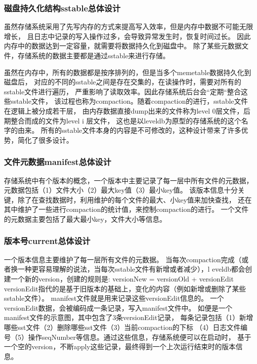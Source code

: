 		\subsubsection{磁盘持久化结构sstable总体设计}

		虽然存储系统采用了先写内存的方式来提高写入效率，但是内存中数据不可能无限增长，
		且日志中记录的写入操作过多，会导致异常发生时，恢复时间过长。
		因此内存中的数据达到一定容量，就需要将数据持久化到磁盘中。
		除了某些元数据文件，存储系统的数据主要都是通过sstable来进行存储。

		虽然在内存中，所有的数据都是按序排列的，但是当多个memetable数据持久化到磁盘后，
		对应的不同的sstable之间是存在交集的，在读操作时，需要对所有的sstable文件进行遍历，
		严重影响了读取效率。因此存储系统后台会“定期“整合这些sstable文件，
		该过程也称为compaction。随着compaction的进行，sstable文件在逻辑上被分成若干层，
		由内存数据直接dump出来的文件称为level 0层文件，后期整合而成的文件为level i 层文件，
		这也是以leveldb为原型的存储系统的这个名字的由来。
		所有的sstable文件本身的内容是不可修改的，这种设计带来了许多优势，简化了很多设计。

		\subsubsection{文件元数据manifest总体设计}

		存储系统中有个版本的概念，一个版本中主要记录了每一层中所有文件的元数据，
		元数据包括（1）文件大小（2）最大key值（3）最小key值。
		该版本信息十分关键，除了在查找数据时，利用维护的每个文件的最大、小key值来加快查找，
		还在其中维护了一些进行compaction的统计值，来控制compaction的进行。
		一个文件的元数据主要包括了最大最小key，文件大小等信息。
		

		\subsubsection{版本号current总体设计}

		一个版本信息主要维护了每一层所有文件的元数据。
		当每次compaction完成（或者换一种更容易理解的说法，当每次sstable文件有新增或者减少），l
		eveldb都会创建一个新的version，创建的规则是: versionNew = versionOld + versionEdit
		versionEdit指代的是基于旧版本的基础上，变化的内容（例如新增或删除了某些sstable文件）。
		manifest文件就是用来记录这些versionEdit信息的。
		一个versionEdit数据，会被编码成一条记录，写入manifest文件中。
		如便是一个manifest文件的示意图，其中包含了3条versionEdit记录，
		每条记录包括（1）新增哪些sst文件（2）删除哪些sst文件（3）当前compaction的下标
		（4）日志文件编号（5）操作seqNumber等信息。通过这些信息，存储系统便可以在启动时，
		基于一个空的version，不断apply这些记录，最终得到一个上次运行结束时的版本信息。

